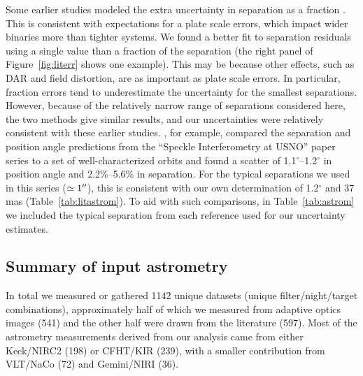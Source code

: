 \documentclass[twocolumn]{aastex62}
\begin{document}
Some earlier studies modeled the extra uncertainty in separation as a fraction \citep[e.g.,][]{Hrt2008,Hor2011,Tok2012d}. This is consistent with expectations for a plate scale errors, which impact wider binaries more than tighter systems. We found a better fit to separation residuals using a single value than a fraction of the separation (the right panel of Figure~\ref{fig:literr} shows one example). This may be because other effects, such as DAR and field distortion, are as important as plate scale errors. In particular, fraction errors tend to underestimate the uncertainty for the smallest separations. However, because of the relatively narrow range of separations considered here, the two methods give similar results, and our uncertainties were relatively consistent with these earlier studies. \citet{2007AJ....134.1671M}, for example, compared the separation and position angle predictions from the ``Speckle Interferometry at USNO'' paper series to a set of well-characterized orbits and found a scatter of 1.1$^{\circ}$--1.2$^{\circ}$ in position angle and 2.2\%--5.6\% in separation. For the typical separations we used in this series ($\simeq1\mbox{$^{\prime\prime}$}$), this is consistent with our own determination of 1.2$^{\circ}$ and 37\,mas (Table~\ref{tab:litastrom}). To aid with such comparisons, in Table~\ref{tab:astrom} we included the typical separation from each reference used for our uncertainty estimates.


\subsection{Summary of input astrometry}

In total we measured or gathered 1142 unique datasets (unique filter/night/target combinations), approximately half of which we measured from adaptive optics images (541) and the other half were drawn from the literature (597). Most of the astrometry measurements derived from our analysis came from either Keck/NIRC2 (198) or CFHT/KIR (239), with a smaller contribution from VLT/NaCo (72) and Gemini/NIRI (36). 
\end{document}
